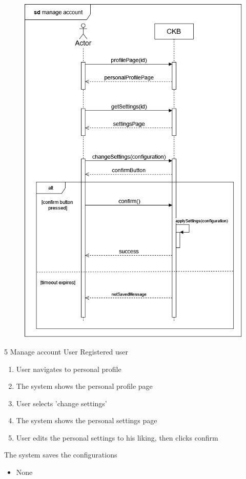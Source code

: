 \usecase
{
    \begin{figure}[H]
        \centering
        \includegraphics[width=\textwidth]{src/sd_diagrams/manageaccount.png}
    \end{figure}
}
{5}
{Manage account} %
{User} %
{Registered user} %
{ %
    \begin{enumerate}
        \item User navigates to personal profile
        \item The system shows the personal profile page
        \item User selects 'change settings'
        \item The system shows the personal settings page
        \item User edits the personal settings to his liking, then clicks confirm
    \end{enumerate}
}
{The system saves the configurations} %
{ %
    \begin{itemize}
        \item None
    \end{itemize}
}
{ %

}


